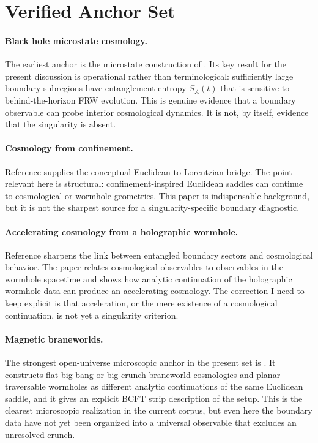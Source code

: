 \documentclass[11pt]{article}
\begin{document}
\section{Verified Anchor Set}

\paragraph{Black hole microstate cosmology.}
The earliest anchor is the microstate construction of \cite{Cooper:2018cmb}. Its key result for the present discussion is operational rather than terminological: sufficiently large boundary subregions have entanglement entropy $S_A(t)$ that is sensitive to behind-the-horizon FRW evolution. This is genuine evidence that a boundary observable can probe interior cosmological dynamics. It is not, by itself, evidence that the singularity is absent.

\paragraph{Cosmology from confinement.}
Reference \cite{VanRaamsdonk:2021qgv} supplies the conceptual Euclidean-to-Lorentzian bridge. The point relevant here is structural: confinement-inspired Euclidean saddles can continue to cosmological or wormhole geometries. This paper is indispensable background, but it is not the sharpest source for a singularity-specific boundary diagnostic.

\paragraph{Accelerating cosmology from a holographic wormhole.}
Reference \cite{Antonini:2022ptt} sharpens the link between entangled boundary sectors and cosmological behavior. The paper relates cosmological observables to observables in the wormhole spacetime and shows how analytic continuation of the holographic wormhole data can produce an accelerating cosmology. The correction I need to keep explicit is that acceleration, or the mere existence of a cosmological continuation, is not yet a singularity criterion.

\paragraph{Magnetic braneworlds.}
The strongest open-universe microscopic anchor in the present set is \cite{Antonini:2024magnetic}. It constructs flat big-bang or big-crunch braneworld cosmologies and planar traversable wormholes as different analytic continuations of the same Euclidean saddle, and it gives an explicit BCFT strip description of the setup. This is the clearest microscopic realization in the current corpus, but even here the boundary data have not yet been organized into a universal observable that excludes an unresolved crunch.
\end{document}
